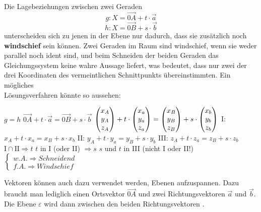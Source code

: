 \pagebreak


Die Lagebeziehungen zwischen zwei Geraden $$g: X = \vec{0A} + t \cdot \vec{a}$$ $$h: X = \vec{0B} + s \cdot \vec{b}$$ unterscheiden sich zu jenen in der Ebene nur dadurch, dass sie zus\"{a}tzlich noch \textbf{windschief} sein k\"{o}nnen. Zwei Geraden im Raum sind windschief, wenn sie weder parallel noch ident sind, und beim Schneiden der beiden Geraden das Gleichungssystem keine wahre Aussage liefert, was bedeutet, dass nur zwei der drei Koordinaten des vermeintlichen Schnittpunkts \"{u}bereinstimmten. Ein m\"{o}gliches \\ L\"{o}sungsverfahren k\"{o}nnte so aussehen:

\begin{center}
  $ g = h$
  \extrapar
  $ \vec{0A} + t \cdot \vec{a} = \vec{0B} + s \cdot \vec{b}$
  \extrapar
  $ \begin{pmatrix}x_{A}\\y_{A}\\z_{A}\end{pmatrix} + t \cdot \begin{pmatrix}x_{a}\\y_{a}\\z_{a}\end{pmatrix} = \begin{pmatrix}x_{B}\\y_{B}\\z_{B}\end{pmatrix} + s\cdot \begin{pmatrix}x_{b}\\y_{b}\\z_{b}\end{pmatrix}$
  \extrapar
  I: $x_{A} + t \cdot x_{a} = x_{B} + s \cdot x_{b}$
  \extrapar
  II: $y_{A} + t \cdot y_{a} = y_{B} + s \cdot y_{b}$
  \extrapar
  III: $z_{A} + t \cdot z_{a} = z_{B} + s \cdot z_{b}$
  \extrapar
  $\text{I} \cap \text{II} \Rightarrow t$
  \extrapar
  $t$ in I (oder II) $\Rightarrow s$
  \extrapar
  $s$ und $t$ in III (nicht I oder II!)
  $
  \begin{cases}
    w.A. \Rightarrow Schneidend\\
    f.A. \Rightarrow Windschief
  \end{cases}
  $
\end{center}

\pagebreak


Vektoren k\"{o}nnen auch dazu verwendet werden, Ebenen aufzuspannen. Dazu braucht man lediglich einen Ortsvektor $\vec{0A}$ und zwei Richtungsvektoren $\vec{a}$ und $\vec{b}$. Die Ebene $\varepsilon$ wird dann zwischen den beiden Richtungsvektoren .

\begin{figure}[h!]
  \centering
  \large
\end{figure}


